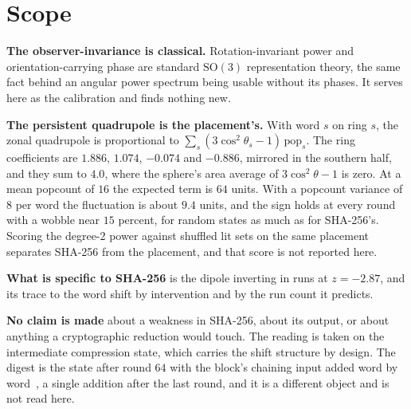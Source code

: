 \section{Scope}

\textbf{The observer-invariance is classical.} Rotation-invariant power and orientation-carrying phase are standard \(\mathrm{SO}(3)\) representation theory, the same fact behind an angular power spectrum being usable without its phases. It serves here as the calibration and finds nothing new.

\textbf{The persistent quadrupole is the placement's.} With word \(s\) on ring \(s\), the zonal quadrupole is proportional to \(\sum_s (3\cos^2\theta_s - 1)\,\mathrm{pop}_s\). The ring coefficients are \(1.886\), \(1.074\), \(-0.074\) and \(-0.886\), mirrored in the southern half, and they sum to \(4.0\), where the sphere's area average of \(3\cos^2\theta - 1\) is zero. At a mean popcount of \(16\) the expected term is \(64\) units. With a popcount variance of \(8\) per word the fluctuation is about \(9.4\) units, and the sign holds at every round with a wobble near \(15\) percent, for random states as much as for SHA-256's. Scoring the degree-2 power against shuffled lit sets on the same placement separates SHA-256 from the placement, and that score is not reported here.

\textbf{What is specific to SHA-256} is the dipole inverting in runs at \(z = -2.87\), and its trace to the word shift by intervention and by the run count it predicts.

\textbf{No claim is made} about a weakness in SHA-256, about its output, or about anything a cryptographic reduction would touch. The reading is taken on the intermediate compression state, which carries the shift structure by design. The digest is the state after round \(64\) with the block's chaining input added word by word~\cite[Section~6.2.2, step~4]{src:FIPS-180-4}, a single addition after the last round, and it is a different object and is not read here.
